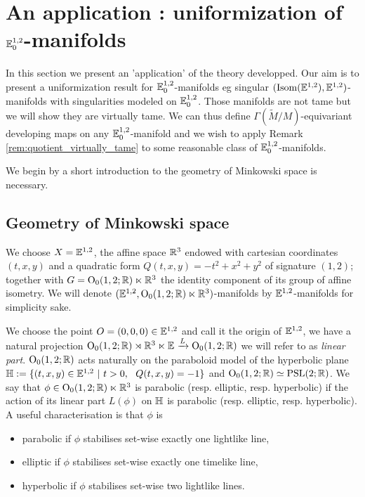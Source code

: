 \section{An application : uniformization of $\mathbb{E}^{1,2}_0$-manifolds}\label{sec:BTZ_uniform}
In this section we present  an 'application' of the theory developped. Our aim is to present a uniformization result for $\mathbb{E}^{1,2}_0$-manifolds eg singular $(\mathrm{Isom}({\mathbb E}^{1,2}_{}),{\mathbb E}^{1,2}_{})$-manifolds with singularities modeled on $\mathbb{E}^{1,2}_0$. 
Those manifolds are not tame but we will show they are virtually tame. 
We can thus define $\Gamma(\widetilde M/M)$-equivariant developing maps on any $\mathbb{E}^{1,2}_0$-manifold and we wish to apply Remark \ref{rem:quotient_virtually_tame} to some reasonable class of $\mathbb{E}^{1,2}_0$-manifolds.

We begin by a short introduction to the geometry of Minkowski space is necessary.

\subsection{Geometry of Minkowski space}\label{sec:Minkowski}
We choose $X = \mathbb{E}^{1,2}$, the affine space $\mathbb R^3$ endowed with cartesian coordinates $(t,x,y)$ and a quadratic form $Q(t,x,y)= -t^2+x^2+y^2$ of signature $(1,2)$;
together with  $G=\mathrm{O}_{0}(1,2 ; \mathbb R)\ltimes \mathbb R^3$ the identity component of its group of affine isometry. 
We will denote $(\mathbb{E}^{1,2},\mathrm{O}_{0}(1,2 ; \mathbb R)\ltimes \mathbb R^3)$-manifolds by $\mathbb{E}^{1,2}$-manifolds for simplicity sake. 


We choose the point $O=(0,0,0)\in \mathbb{E}^{1,2}$ and call it the origin of $\mathbb{E}^{1,2}$,  we have a natural projection $\mathrm{O}_{0}(1,2 ; \mathbb R)\rtimes \mathbb R^3 \ltimes \mathbb{E}^{}\xrightarrow{L}  \mathrm{O}_{0}(1,2 ; \mathbb R)$ we will refer to as {\it linear part}. $\mathrm{O}_{0}(1,2 ; \mathbb R)$ acts naturally on the paraboloid model of the hyperbolic plane $\mathbb{H} := \{(t,x,y)\in \mathbb{E}^{1,2}~|~ t>0, ~~Q(t,x,y)=-1 \}$ and $\mathrm{O}_{0}(1,2 ; \mathbb R) \simeq \mathrm{PSL}(2;\mathbb R)$. We say that $\phi\in \mathrm{O}_{0}(1,2 ; \mathbb R)\ltimes \mathbb R^3$  is parabolic (resp. elliptic, resp. hyperbolic) if the action of its linear part $L(\phi)$ on  $\mathbb{H}$ is parabolic (resp. elliptic, resp. hyperbolic).
A useful characterisation is that $\phi$ is 
\begin{itemize}
 \item parabolic if $\phi$ stabilises set-wise exactly one lightlike line, 
 \item elliptic if $\phi$ stabilises set-wise exactly one timelike line,
 \item hyperbolic if $\phi$ stabilises set-wise two lightlike lines.
\end{itemize}



